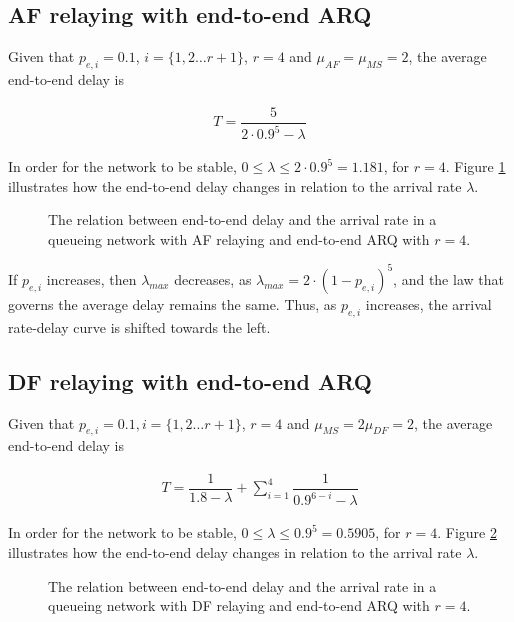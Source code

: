 \subsection{AF relaying with end-to-end ARQ}
Given that $p_{e,i} = 0.1$, $i = \{1,2 \dots r+1\}$, $r=4$ and
$\mu_{AF} = \mu_{MS} = 2$, the average end-to-end delay is

\begin{align}
  T = \dfrac{5}{2 \cdot 0.9^5 - \lambda}
  \label{eq:05_T_af_e2e}
\end{align}

In order for the network to be stable,
$0 \leq \lambda \leq 2 \cdot 0.9^5 = 1.181$, for $r=4$. Figure
\ref{fig:05_arrival_rate_af_e2e} illustrates how the end-to-end delay changes
in relation to the arrival rate $\lambda$.

\begin{figure}\centering
  
  \caption{The relation between end-to-end delay and the arrival rate in a
    queueing network with AF relaying and end-to-end ARQ with $r=4$.}
  \label{fig:05_arrival_rate_af_e2e}
\end{figure}

If $p_{e,i}$ increases, then $\lambda_{max}$ decreases, as
$\lambda_{max} = 2 \cdot (1-p_{e,i})^5$, and the law that governs the average
delay remains the same. Thus, as $p_{e,i}$ increases, the arrival rate-delay
curve is shifted towards the left.


\subsection{DF relaying with end-to-end ARQ}

Given that $p_{e,i} = 0.1, i = \{1,2 \dots r+1\}$, $r=4$ and
$\mu_{MS} = 2\mu_{DF} = 2$, the average end-to-end delay is

\begin{align}
  T = \dfrac{1}{1.8 - \lambda} + \sum\limits_{i=1}^4 \dfrac{1}{0.9^{6-i} - \lambda}
  \label{eq:05_T_df_e2e}
\end{align}


In order for the network to be stable,
$0 \leq \lambda \leq 0.9^5 = 0.5905$, for $r=4$. Figure
\ref{fig:05_arrival_rate_df_e2e} illustrates how the end-to-end delay changes in
relation to the arrival rate $\lambda$.


\begin{figure}\centering
  
  \caption{The relation between end-to-end delay and the arrival rate in a
    queueing network with DF relaying and end-to-end ARQ with $r=4$.}
  \label{fig:05_arrival_rate_df_e2e}
\end{figure}


